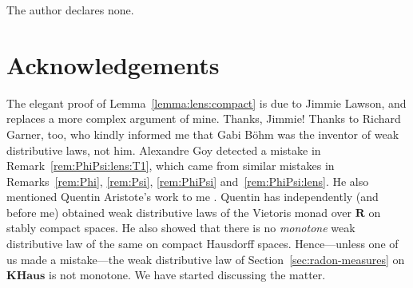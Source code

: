 \documentclass[preprint,12pt]{elsarticle}
\begin{document}
The author declares none.

\section*{Acknowledgements}

The elegant proof of Lemma~\ref{lemma:lens:compact} is due to Jimmie
Lawson, and replaces a more complex argument of mine.  Thanks, Jimmie!
Thanks to Richard Garner, too, who kindly informed me that Gabi B\"ohm
was the inventor of weak distributive laws, not him.  Alexandre Goy
detected a mistake in Remark~\ref{rem:PhiPsi:lens:T1}, which came from
similar mistakes in Remarks~\ref{rem:Phi}, \ref{rem:Psi},
\ref{rem:PhiPsi} and~\ref{rem:PhiPsi:lens}.  He also mentioned Quentin
Aristote's work to me \cite{Aristote:weak:distr}.  Quentin has
independently (and before me) obtained weak distributive laws of the
Vietoris monad over $\mathbf R$ on stably compact spaces.  He also
showed that there is no \emph{monotone} weak distributive law of the
same on compact Hausdorff spaces.  Hence---unless one of us made a
mistake---the weak distributive law of
Section~\ref{sec:radon-measures} on $\mathbf{KHaus}$ is not monotone.
We have started discussing the matter.
\end{document}
